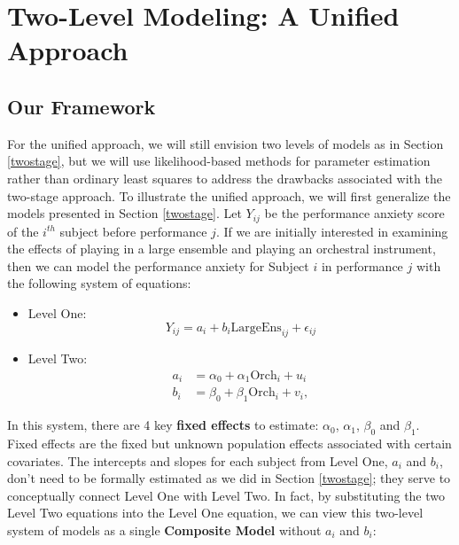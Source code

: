 \documentclass[
]{krantz}
\providecommand{\tightlist}{%
  \setlength{\itemsep}{0pt}\setlength{\parskip}{0pt}}
\begin{document}
\section{Two-Level Modeling: A Unified Approach}\label{twolevelmodelingunified}

\subsection{Our Framework}\label{ourframework}

For the unified approach, we will still envision two levels of models as in Section \ref{twostage}, but we will use likelihood-based methods for parameter estimation rather than ordinary least squares to address the drawbacks associated with the two-stage approach. To illustrate the unified approach, we will first generalize the models presented in Section \ref{twostage}. Let \(Y_{ij}\) be the performance anxiety score of the \(i^{th}\) subject before performance \(j\). If we are initially interested in examining the effects of playing in a large ensemble and playing an orchestral instrument, then we can model the performance anxiety for Subject \(i\) in performance \(j\) with the following system of equations:

\begin{itemize}
\tightlist
\item
  Level One:
  \begin{equation*}
  Y_{ij} = a_{i}+b_{i}\textrm{LargeEns}_{ij}+\epsilon_{ij}
  \end{equation*}
\item
  Level Two:
  \begin{align*}
  a_{i} & = \alpha_{0}+\alpha_{1}\textrm{Orch}_{i}+u_{i} \\
  b_{i} & = \beta_{0}+\beta_{1}\textrm{Orch}_{i}+v_{i},
  \end{align*}
\end{itemize}

In this system, there are 4 key \textbf{fixed effects} to estimate: \(\alpha_{0}\), \(\alpha_{1}\), \(\beta_{0}\) and \(\beta_{1}\). Fixed effects are the fixed but unknown population effects associated with certain covariates. The intercepts and slopes for each subject from Level One, \(a_{i}\) and \(b_{i}\), don't need to be formally estimated as we did in Section \ref{twostage}; they serve to conceptually connect Level One with Level Two. In fact, by substituting the two Level Two equations into the Level One equation, we can view this two-level system of models as a single \textbf{Composite Model}  without \(a_{i}\) and \(b_{i}\):
\end{document}
